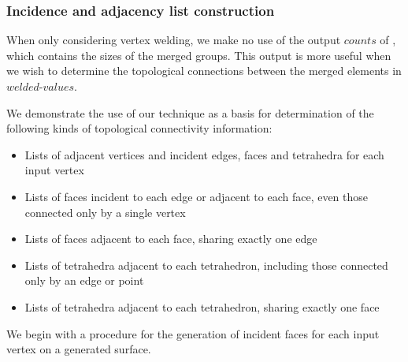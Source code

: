 \documentclass[10pt,journal,cspaper,compsoc]{IEEEtran}
\begin{document}
\subsubsection{Incidence and adjacency list construction}
\label{sec:topology}
When only considering vertex welding, we make no use of the output $counts$ of , which contains the sizes of the merged groups. This output is more useful when we wish to determine the topological connections between the merged elements in $welded\mbox{-}values$. 

\noindent
\begin{minipage}{\linewidth}
We demonstrate the use of our  technique as a basis for determination of the following kinds of topological connectivity information:

\begin{itemize}
\item{Lists of adjacent vertices and incident edges, faces and tetrahedra for each input vertex}
\item{Lists of faces incident to each edge or adjacent to each face, even those connected only by a single vertex}
\item{Lists of faces adjacent to each face, sharing exactly one edge}
\item{Lists of tetrahedra adjacent to each tetrahedron, including those connected only by an edge or point}
\item{Lists of tetrahedra adjacent to each tetrahedron, sharing exactly one face}
\end{itemize}
\vspace{0.2cm}
\end{minipage}

We begin with a procedure  for the generation of incident faces for each input vertex on a generated surface. 

\end{document}
